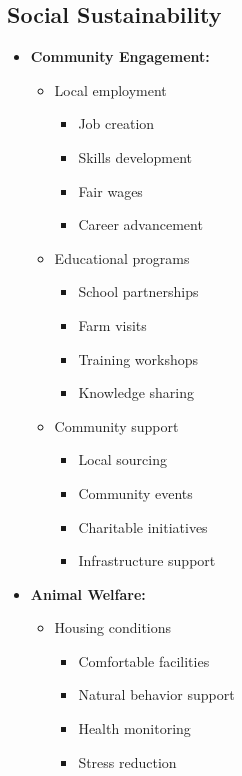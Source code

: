 \subsection{Social Sustainability}
\begin{itemize}
    \item \textbf{Community Engagement:}
    \begin{itemize}
        \item Local employment
        \begin{itemize}
            \item Job creation
            \item Skills development
            \item Fair wages
            \item Career advancement
        \end{itemize}
        
        \item Educational programs
        \begin{itemize}
            \item School partnerships
            \item Farm visits
            \item Training workshops
            \item Knowledge sharing
        \end{itemize}
        
        \item Community support
        \begin{itemize}
            \item Local sourcing
            \item Community events
            \item Charitable initiatives
            \item Infrastructure support
        \end{itemize}
    \end{itemize}
    
    \item \textbf{Animal Welfare:}
    \begin{itemize}
        \item Housing conditions
        \begin{itemize}
            \item Comfortable facilities
            \item Natural behavior support
            \item Health monitoring
            \item Stress reduction
        \end{itemize}
        

\end{itemize}
\end{itemize}
